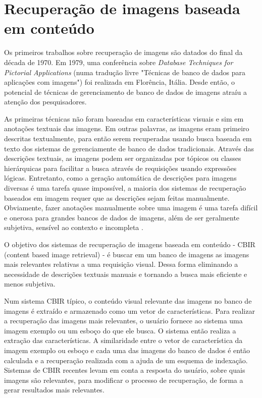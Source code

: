 \chapter{Recuperação de imagens baseada em conteúdo}

Os primeiros trabalhos sobre recuperação de imagens são datados do final da década de 1970. Em 1979, uma conferência sobre \textit{Database Techniques for Pictorial Applications} (numa tradução livre "Técnicas de banco de dados para aplicações com imagens") foi realizada em Florência, Itália. Desde então, o potencial de técnicas de gerenciamento de banco de dados de imagens atraíu a atenção dos pesquisadores.

As primeiras técnicas não foram baseadas em características visuais e sim em anotações textuais das imagens. Em outras palavras, as imagens eram primeiro descritas textualmente, para então serem recuperadas usando busca baseada em texto dos sistemas de gerenciamente de banco de dados tradicionais. Através das descrições textuais, as imagens podem ser organizadas por tópicos ou classes hierárquicas para facilitar a busca através de requisições usando expressões lógicas. Entretanto, como a geração automática de descrições para imagens diversas é uma tarefa quase impossível, a maioria dos sistemas de recuperação baseados em imagem requer que as descrições sejam feitas manualmente. Obviamente, fazer anotações manualmente sobre uma imagem é uma tarefa difícil e onerosa para grandes bancos de dados de imagens, além de ser geralmente subjetiva, sensível ao contexto e incompleta \cite{feng-chapter}.

O objetivo dos sistemas de recuperação de imagens baseada em conteúdo - CBIR (content based image retrieval) - é buscar em um banco de imagens as imagens mais relevantes relativas a uma requisição visual. Dessa forma eliminando a necessidade de descrições textuais manuais e tornando a busca mais eficiente e menos subjetiva.

Num sistema CBIR típico, o conteúdo visual relevante das imagens no banco de imagens é extraído e armazenado como um vetor de características. Para realizar a recuperação das imagens mais relevantes, o usuário fornece ao sistema uma imagem exemplo ou um esboço do que ele busca. O sistema então realiza a extração das características. A similaridade entre o vetor de característica da imagem exemplo ou esboço e cada uma das imagens do banco de dados é então calculada e a recuperação realizada com a ajuda de um esquema de indexação. Sistemas de CBIR recentes levam em conta a resposta do usuário, sobre quais imagens são relevantes, para modificar o processo de recuperação, de forma a gerar resultados mais relevantes.

